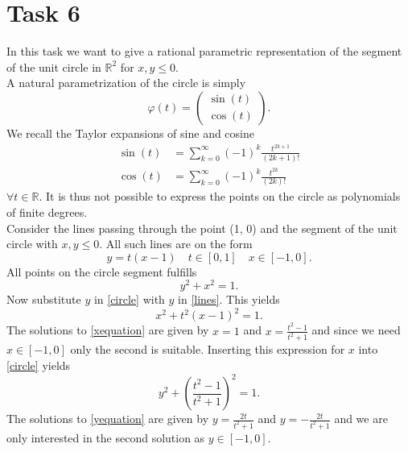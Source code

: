 \documentclass[]{article}
\begin{document}
\section*{Task 6}
In this task we want to give a rational parametric representation of the segment of the unit circle in $\mathbb{R}^2$ for $x, y \leq 0$.\\
A natural parametrization of the circle is simply\begin{equation*}
\varphi(t) = \left(\begin{array}{c}
\sin(t)\\
\cos(t)
\end{array}\right).
\end{equation*}
We recall the Taylor expansions of sine and cosine\begin{equation}
\begin{aligned}
\sin(t) &= \sum_{k=0}^{\infty}(-1)^k\frac{t^{2k+1}}{(2k+1)!}\\
\cos(t) &= \sum_{k=0}^{\infty}(-1)^k\frac{t^{2k}}{(2k)!}
\end{aligned}
\end{equation}
$\forall t\in\mathbb{R}$. It is thus not possible to express the points on the circle as polynomials of finite degrees.\\
Consider the lines passing through the point (1, 0) and the segment of the unit circle with $x, y\leq 0$. All such lines are on the form \begin{equation}\label{lines}
y=t(x-1)\quad t\in[0, 1]\quad x\in[-1, 0].
\end{equation}
All points on the circle segment fulfills \begin{equation}\label{circle}
y^2 + x^2 = 1.
\end{equation} 
Now substitute $y$ in \eqref{circle} with $y$ in \eqref{lines}. This yields\begin{equation}\label{xequation}
x^2 + t^2(x - 1)^2 = 1.
\end{equation}
The solutions to \eqref{xequation} are given by $x=1$ and $x=\frac{t^2 - 1}{t^2 + 1}$ and since we need $x\in [-1, 0]$ only the second is suitable. Inserting this expression for $x$ into \eqref{circle} yields\begin{equation}\label{yequation}
y^2 + \left(\frac{t^2 - 1}{t^2 + 1}\right)^2 = 1.
\end{equation}
The solutions to \eqref{yequation} are given by $y=\frac{2t}{t^2 + 1}$ and $y=-\frac{2t}{t^2 + 1}$ and we are only interested in the second solution as $y\in[-1, 0]$.\\
\end{document}
